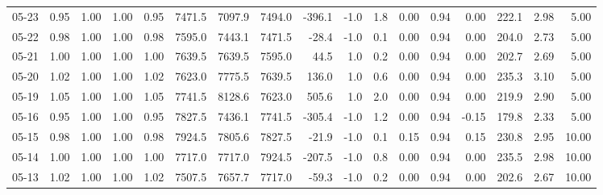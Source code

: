 \begin{threeparttable}
{\begin{tabular}{lrrrrrrrrrrrrrrrr}
  05-23 &         0.95 &           1.00 &          1.00 &          0.95 & 7471.5 & 7097.9 & 7494.0 &     -396.1 &                     -1.0 &                 1.8 &       0.00 &      0.94 &           0.00 &            222.1 &            2.98 &                   5.00 \\
  05-22 &         0.98 &           1.00 &          1.00 &          0.98 & 7595.0 & 7443.1 & 7471.5 &      -28.4 &                     -1.0 &                 0.1 &       0.00 &      0.94 &           0.00 &            204.0 &            2.73 &                   5.00 \\
  05-21 &         1.00 &           1.00 &          1.00 &          1.00 & 7639.5 & 7639.5 & 7595.0 &       44.5 &                      1.0 &                 0.2 &       0.00 &      0.94 &           0.00 &            202.7 &            2.69 &                   5.00 \\
  05-20 &         1.02 &           1.00 &          1.00 &          1.02 & 7623.0 & 7775.5 & 7639.5 &      136.0 &                      1.0 &                 0.6 &       0.00 &      0.94 &           0.00 &            235.3 &            3.10 &                   5.00 \\
  05-19 &         1.05 &           1.00 &          1.00 &          1.05 & 7741.5 & 8128.6 & 7623.0 &      505.6 &                      1.0 &                 2.0 &       0.00 &      0.94 &           0.00 &            219.9 &            2.90 &                   5.00 \\
  05-16 &         0.95 &           1.00 &          1.00 &          0.95 & 7827.5 & 7436.1 & 7741.5 &     -305.4 &                     -1.0 &                 1.2 &       0.00 &      0.94 &          -0.15 &            179.8 &            2.33 &                   5.00 \\
  05-15 &         0.98 &           1.00 &          1.00 &          0.98 & 7924.5 & 7805.6 & 7827.5 &      -21.9 &                     -1.0 &                 0.1 &       0.15 &      0.94 &           0.15 &            230.8 &            2.95 &                  10.00 \\
  05-14 &         1.00 &           1.00 &          1.00 &          1.00 & 7717.0 & 7717.0 & 7924.5 &     -207.5 &                     -1.0 &                 0.8 &       0.00 &      0.94 &           0.00 &            235.5 &            2.98 &                  10.00 \\
  05-13 &         1.02 &           1.00 &          1.00 &          1.02 & 7507.5 & 7657.7 & 7717.0 &      -59.3 &                     -1.0 &                 0.2 &       0.00 &      0.94 &           0.00 &            202.6 &            2.67 &                  10.00 \\

\end{tabular}}
\end{threeparttable}
